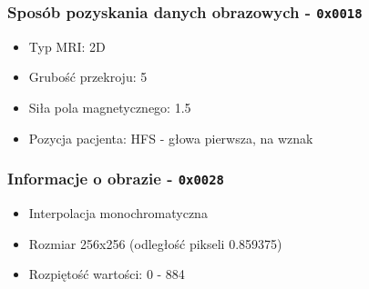 \begin{frame}
  \frametitle{Sposób pozyskania danych obrazowych - \texttt{0x0018}}

  \begin{itemize}
    \item Typ MRI: 2D
    \item Grubość przekroju: 5
    \item Siła pola magnetycznego: 1.5
    \item Pozycja pacjenta: HFS - głowa pierwsza, na wznak
  \end{itemize}
\end{frame}


\begin{frame}
  \frametitle{Informacje o obrazie - \texttt{0x0028}}
\begin{itemize}
  \item Interpolacja monochromatyczna
  \item Rozmiar 256x256 (odległość pikseli 0.859375)
  \item Rozpiętość wartości: 0 - 884
\end{itemize}
\end{frame}
